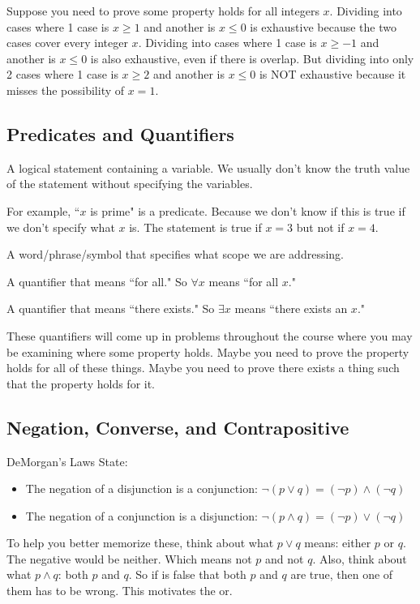 \documentclass[11pt]{scrartcl}
\begin{document}
Suppose you need to prove some property holds for all integers $x$. Dividing into cases where 1 case is $x \geq 1$ and another is $x \leq 0$ is exhaustive because the two cases cover every integer $x$. Dividing into cases where 1 case is $x \geq -1$ and another is $x \leq 0$ is also exhaustive, even if there is overlap. But dividing into only 2 cases where 1 case is $x \geq 2$ and another is $x \leq 0$ is NOT exhaustive because it misses the possibility of $x = 1$.

\subsection{Predicates and Quantifiers}

\begin{definition}[Predicate]
    A logical statement containing a variable. We usually don't know the truth value of the statement without specifying the variables.
\end{definition}
For example, ``$x$ is prime" is a predicate. Because we don't know if this is true if we don't specify what $x$ is. The statement is true if $x = 3$ but not if $x = 4$.

\begin{definition}[Quantifier]
    A word/phrase/symbol that specifies what scope we are addressing.
\end{definition}

\begin{definition}
A quantifier that means ``for all." So $\forall x$ means ``for all $x$."
\end{definition}

\begin{definition}
A quantifier that means ``there exists." So $\exists x$ means ``there exists an $x$."
\end{definition}

These quantifiers will come up in problems throughout the course where you may be examining where some property holds. Maybe you need to prove the property holds for all of these things. Maybe you need to prove there exists a thing such that the property holds for it.

\subsection{Negation, Converse, and Contrapositive}

DeMorgan's Laws State:
\begin{itemize}
    \item The negation of a disjunction is a conjunction: $\neg(p \vee q) = (\neg p) \wedge (\neg q)$
    \item The negation of a conjunction is a disjunction: $\neg(p \wedge q) = (\neg p) \vee (\neg q)$
\end{itemize}
To help you better memorize these, think about what $p \vee q$ means: either $p$ or $q$. The negative would be neither. Which means not $p$ and not $q$. Also, think about what $p \wedge q$: both $p$ and $q$. So if is false that both $p$ and $q$ are true, then one of them has to be wrong. This motivates the or.
\end{document}
